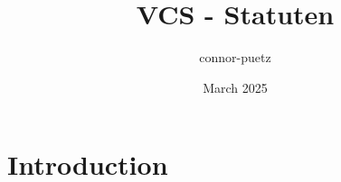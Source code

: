 \documentclass{article}
\title{VCS - Statuten}
\author{connor-puetz }
\date{March 2025}
\begin{document}
\maketitle

\section{Introduction}
\end{document}
